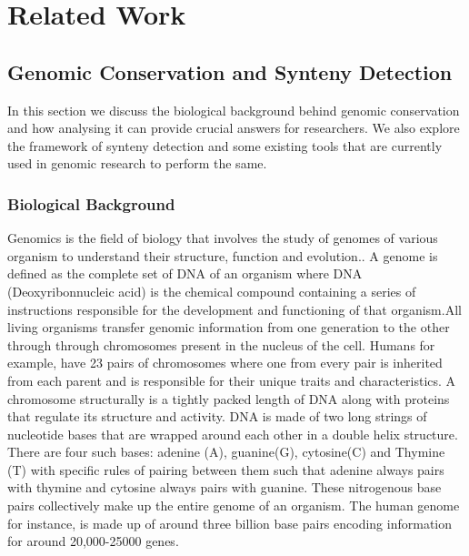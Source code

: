 \chapter{Related Work}

\section{Genomic Conservation and Synteny Detection}
In this section we discuss the biological background behind genomic conservation and how analysing it can provide crucial answers for researchers. We also explore the framework of synteny detection and some existing tools that are currently used in genomic research to perform the same.

\subsection{Biological Background}

Genomics is the field of biology that involves the study of genomes of various organism to understand their structure, function and evolution.\cite{world2002genomics}. A genome is defined as the complete set of DNA of an organism where DNA (Deoxyribonnucleic acid) is the chemical compound containing a series of instructions responsible for the development and functioning of that organism\cite{genomegov}.All living organisms transfer genomic information from one generation to the other through through chromosomes present in the nucleus of the cell. Humans for example, have 23 pairs of chromosomes where one from every pair is inherited from each parent and is responsible for their unique traits and characteristics. A chromosome structurally is a tightly packed length of DNA along with proteins that regulate its structure and activity. DNA is made of two long strings of nucleotide bases that are wrapped around each other in a double helix structure. There are four such bases: adenine (A), guanine(G), cytosine(C) and Thymine (T) with specific rules of pairing between them such that adenine always pairs with thymine and cytosine always pairs with guanine. These nitrogenous base pairs collectively make up the entire genome of an organism. The human genome for instance, is made up of around three billion base pairs encoding information for around 20,000-25000 genes\cite{international2004finishing}. 

